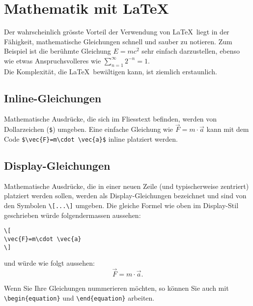 \section{Mathematik mit \LaTeX}
Der wahrscheinlich grösste Vorteil der Verwendung von \LaTeX\  liegt in der Fähigkeit, mathematische Gleichungen schnell und sauber zu notieren. Zum Beispiel ist die berühmte Gleichung $E = mc^2$ sehr einfach darzustellen, ebenso wie etwas Anspruchsvolleres wie $\sum_{n=1}^{\infty} 2^{-n}=1$.\\ Die Komplexität, die \LaTeX\ bewältigen kann, ist ziemlich erstaunlich. %

\subsection{Inline-Gleichungen}
Mathematische Ausdrücke, die sich im Fliesstext befinden, werden von Dollarzeichen (\verb|$|) umgeben. Eine einfache Gleichung wie $\vec{F}=m\cdot \vec{a}$ kann mit dem Code \verb|$\vec{F}=m\cdot \vec{a}$| inline platziert werden.

\subsection{Display-Gleichungen}
Mathematische Ausdrücke, die in einer neuen Zeile (und typischerweise zentriert) platziert werden sollen, werden als Display-Gleichungen bezeichnet und sind von den Symbolen \verb|\[...\]| umgeben. Die gleiche Formel wie oben im Display-Stil geschrieben würde folgendermassen aussehen:

\begin{verbatim}
\[
\vec{F}=m\cdot \vec{a}
\]
\end{verbatim}

\noindent und würde wie folgt aussehen:
\[
\vec{F}=m\cdot \vec{a}.
\] 

\noindent Wenn Sie Ihre Gleichungen nummerieren möchten, so können Sie auch mit \verb|\begin{equation}| und \verb|\end{equation}| arbeiten.

